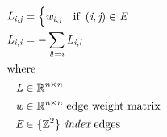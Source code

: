 \documentclass[12pt]{article}
\begin{document}
\begin{center}
\resizebox{\textwidth}{!} 
{
\begin{minipage}[c]{\textwidth}
\begin{align*}
\textit{L}_{\textit{i}, \textit{j}} & = \begin{cases} \textit{w}_{\textit{i}, \textit{j}} & \text{if }  \left( \textit{i}, \textit{j} \right) \in \textit{E}  \\ \end{cases}  \\
\textit{L}_{\textit{i}, \textit{i}} & = -\sum_{\textit{l} != \textit{i}} \textit{L}_{\textit{i}, \textit{l}} \\
\intertext{where} 
\textit{L} & \in \mathbb{R}^{ \textit{n} \times \textit{n} } \\
\textit{w} & \in \mathbb{R}^{ \textit{n} \times \textit{n} } \text{ edge weight matrix} \\
\textit{E} & \in \{\mathbb{{Z}}^{{2}}\} \textit{{ index}} \text{ edges} \\
\\
\end{align*}
\end{minipage}
}
\end{center}
\end{document}
